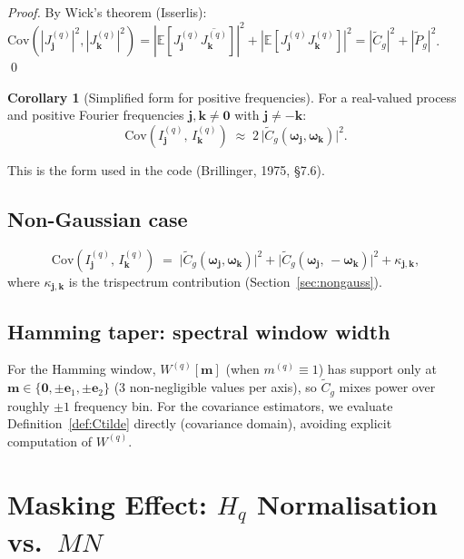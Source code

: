 \documentclass[12pt]{article}
\theoremstyle{definition}
\newtheorem{corollary}{Corollary}
\begin{document}
\begin{proof}
By Wick's theorem (Isserlis):
$\mathrm{Cov}(|J^{(q)}_{\mathbf{j}}|^2, |J^{(q)}_{\mathbf{k}}|^2)
= |\mathbb{E}[J^{(q)}_{\mathbf{j}}\overline{J^{(q)}_{\mathbf{k}}}]|^2
+ |\mathbb{E}[J^{(q)}_{\mathbf{j}}J^{(q)}_{\mathbf{k}}]|^2
= |\tilde{C}_g|^2 + |\tilde{P}_g|^2$. \qed
\end{proof}

\begin{corollary}[Simplified form for positive frequencies]
\label{cor:pos_freq}
For a real-valued process and positive Fourier frequencies
$\mathbf{j},\mathbf{k}\neq\mathbf{0}$ with $\mathbf{j}\neq-\mathbf{k}$:
\[
\boxed{
  \mathrm{Cov}(I^{(q)}_{\mathbf{j}},\, I^{(q)}_{\mathbf{k}})
  \;\approx\;
  2\,\bigl|\tilde{C}_g(\boldsymbol{\omega}_{\mathbf{j}},\boldsymbol{\omega}_{\mathbf{k}})\bigr|^2.
}
\]
\end{corollary}

This is the form used in the code (Brillinger, 1975, \S7.6).

\subsection{Non-Gaussian case}

\[
  \mathrm{Cov}(I^{(q)}_{\mathbf{j}},\, I^{(q)}_{\mathbf{k}})
  \;=\;
  \bigl|\tilde{C}_g(\boldsymbol{\omega}_{\mathbf{j}},\boldsymbol{\omega}_{\mathbf{k}})\bigr|^2
  +
  \bigl|\tilde{C}_g(\boldsymbol{\omega}_{\mathbf{j}},\,-\boldsymbol{\omega}_{\mathbf{k}})\bigr|^2
  + \kappa_{\mathbf{j},\mathbf{k}},
\]
where $\kappa_{\mathbf{j},\mathbf{k}}$ is the trispectrum contribution
(Section~\ref{sec:nongauss}).

\subsection{Hamming taper: spectral window width}

For the Hamming window, $W^{(q)}[\mathbf{m}]$ (when $m^{(q)}\equiv 1$) has
support only at $\mathbf{m}\in\{\mathbf{0},\pm\mathbf{e}_1,\pm\mathbf{e}_2\}$
(3 non-negligible values per axis), so $\tilde{C}_g$ mixes power over
roughly $\pm 1$ frequency bin.
For the covariance estimators, we evaluate Definition~\ref{def:Ctilde}
directly (covariance domain), avoiding explicit computation of $W^{(q)}$.


\section{Masking Effect: $H_q$ Normalisation vs.\ $MN$}
\label{sec:masking}
\end{document}
